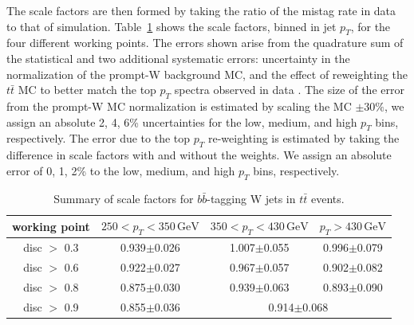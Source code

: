The scale factors are then formed by taking the ratio of the mistag rate in data to that of simulation. Table~\ref{tab:sf} shows the scale factors, binned in jet $p_{T}$, for the four different working points. The errors shown arise from the quadrature sum of the statistical and two additional systematic errors: uncertainty in the normalization of the prompt-W background MC, and the effect of reweighting the $t\bar{t}$ MC to better match the top $p_{T}$ spectra observed in data \cite{toppt}. The size of the error from the prompt-W MC normalization is estimated by scaling the MC $\pm30\%$, we assign an absolute 2, 4, 6\% uncertainties for the low, medium, and high $p_{T}$ bins, respectively. The error due to the top $p_{T}$ re-weighting is estimated by taking the difference in scale factors with and without the weights. We assign an absolute error of 0, 1, 2\% to the low, medium, and high $p_{T}$ bins, respectively.

\begin{table}[hbp!]
\centering
\caption{Summary of scale factors for $b\bar{b}$-tagging W jets in $t\bar{t}$ events.}
\label{tab:sf}
\begin{tabular}{c|ccc}
\hline\hline
working point & $250 < p_{T} < 350\,\textrm{GeV}$ & $350 < p_{T} < 430\,\textrm{GeV}$ & $p_{T}>430\,\textrm{GeV}$\\
\hline
disc $>$ 0.3 & 0.939$\pm$0.026 & 1.007$\pm$0.055 & 0.996$\pm$0.079 \\
disc $>$ 0.6 & 0.922$\pm$0.027 & 0.967$\pm$0.057 & 0.902$\pm$0.082  \\
disc $>$ 0.8 & 0.875$\pm$0.030 & 0.939$\pm$0.063 & 0.893$\pm$0.090  \\
disc $>$ 0.9 & 0.855$\pm$0.036 & \multicolumn{2}{c}{0.914$\pm$0.068} \\
\hline\hline
\end{tabular}
\end{table}
